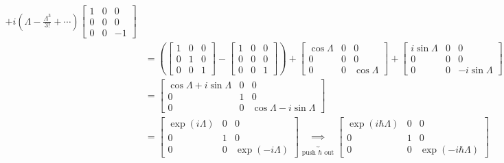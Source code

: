 \documentclass[letter, 10pts]{article}
\newcommand{\hb}{\hbar}
\begin{document}
\begin{align*}
		+
	i 
	\left(
\Lambda 
	-
	\frac{\Lambda^3}{3!}
+ \cdots
		\right) 
	\begin{bmatrix} 1&0&0\\0&0&0\\0&0&-1 \end{bmatrix} 
	\\ &= 
	\left(\begin{bmatrix} 1&0&0\\0&1&0\\0&0&1 \end{bmatrix} -
	\begin{bmatrix} 1&0&0\\0&0&0\\0&0&1 \end{bmatrix}   \right)
	+  
	\begin{bmatrix} \cos \Lambda & 0 & 0 \\ 
	0 & 0 & 0 \\ 
0 & 0 & \cos \Lambda \end{bmatrix} 
+ 
		\begin{bmatrix} i \sin \Lambda & 0 & 0 
		\\ 0 & 0 & 0 \\ 
	0 & 0 & - i \sin \Lambda
\end{bmatrix} 
	\\
	&= 
			\begin{bmatrix} \cos \Lambda + i \sin \Lambda &0&0\\
			0&1&0\\
		0&0& \cos \Lambda - i \sin \Lambda \end{bmatrix} 
	\\
	&= 
			\begin{bmatrix} 
				\exp 
			\left(  i \Lambda \right )
			&0&0\\
			0&1&0\\
		0&0& 
				\exp 
			\left(- i \Lambda \right)  \end{bmatrix} 
			\underbrace{\implies}_{\text{push $\hb$ out}}
			\begin{bmatrix} 
				\exp 
			\left(  i \hb \Lambda \right )
			&0&0\\
			0&1&0\\
		0&0& 
				\exp 
			\left(- i \hb \Lambda \right)  \end{bmatrix} 
\end{align*}
\end{document}
